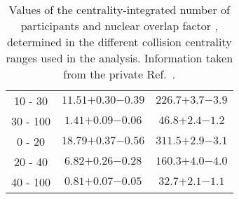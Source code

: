 \begin{table}[htb!]
\begin{tabular}{|c|c|c|}
  \hline%
  10 - 30   & $11.51 {+0.30} {-0.39}$  &   $226.7 {+3.7} {-3.9}$ \\   
  30 - 100  & $1.41 {+0.09} {-0.06}$   &   $46.8 {+2.4} {-1.2}$  \\
  \hline%
  0 - 20    & $18.79 {+0.37} {-0.56}$  &   $311.5 {+2.9} {-3.1}$ \\   
  20 - 40   & $6.82 {+0.26} {-0.28}$   &   $160.3 {+4.0} {-4.0}$ \\ 
  40 - 100  & $0.81 {+0.07} {-0.05}$   &   $32.7 {+2.1} {-1.1}$  \\ 
  \hline
 \end{tabular}
 \caption{Values of the centrality-integrated number of participants \avgnpart and nuclear overlap factor \avgtaa, determined in the different collision centrality ranges used in the analysis. Information taken from the private Ref.~\cite{Centrality_PbPb}.}
 \label{tab:TAAValues}
\end{table}

